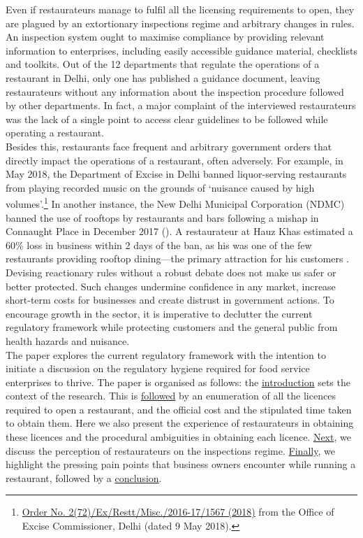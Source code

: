 \documentclass[a4paper, 12pt]{article}
\begin{document}
                    Even if restaurateurs manage to fulfil all the licensing requirements to open, they are plagued by an extortionary inspections regime and arbitrary changes in rules. An inspection system ought to maximise compliance by providing relevant information to 
enterprises, including easily accessible guidance material, checklists and toolkits. Out of the 12 departments that regulate the operations of a restaurant in Delhi, only one has published a guidance document, leaving restaurateurs without any information about the 
inspection procedure followed by other departments. In fact, a major complaint of the interviewed restaurateurs was the lack of a single point to access clear guidelines to be followed while operating a restaurant. \\
                    
                    Besides this, restaurants face frequent and arbitrary government orders that directly impact the operations of a restaurant, often adversely. For example, in May 2018, the Department of Excise in Delhi banned liquor-serving restaurants from playing 
recorded music on the grounds of ‘nuisance caused by high volumes’.\footnote{\href{https://bit.ly/2MzCM02}{Order No. 2(72)/Ex/Restt/Misc./2016-17/1567 (2018)} from the Office of Excise Commissioner, Delhi (dated 9 May 2018).} In another instance, the New 
Delhi Municipal Corporation (NDMC) banned the use of rooftops by restaurants and bars following a mishap in Connaught Place in December 2017 (\cite{toi2017rooftopbanCP}). A restaurateur at Hauz Khas estimated a 60\% loss in business  within 2 days of the ban, 
as his was one of the few restaurants providing rooftop dining—the primary attraction for his customers \parencite{toi2015hkvterraceshut}. \\
                    
                    Devising reactionary rules without a robust debate does not make us safer or better protected. Such changes undermine confidence in any market, increase short-term costs for businesses and create distrust in government actions. To encourage 
growth in the sector, it is imperative to declutter the current regulatory framework while protecting customers and the general public from health hazards and nuisance. \\
                    
                   The paper explores the current regulatory framework with the intention to initiate a discussion on the regulatory hygiene required for food service enterprises to thrive. The paper is organised as follows: the \hyperref[intro]{introduction} sets the context of 
the research. This is \hyperref[sec:1]{followed} by an enumeration of all the licences required to open a restaurant, and the official cost and the stipulated time taken to obtain them. Here we also present the experience of restaurateurs in obtaining these licences 
and the procedural ambiguities in obtaining each licence. \hyperref[sec:2]{Next}, we discuss the perception of restaurateurs on the inspections regime. \hyperref[sec:3]{Finally}, we highlight the pressing pain points that business owners encounter while running a 
restaurant, followed by a \hyperref[end]{conclusion}.   
\end{document}
